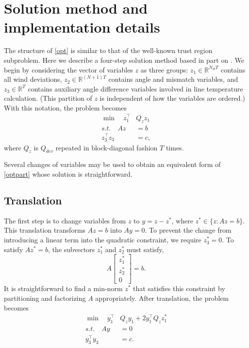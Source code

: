 \documentclass[conference]{IEEEtran}
\begin{document}
\section{Solution method and implementation details}\label{sec:solution}

The structure of \eqref{opt} is similar to that of the well-known trust region subproblem. Here we describe a four-step solution method based in part on \cite{bienstock2014}. We begin by considering the vector of variables $z$ as three groups: $z_1\in\mathbb{R}^{N_RT}$ contains all wind deviations, $z_2\in\mathbb{R}^{(N+1)T}$ contains angle and mismatch variables, and $z_3\in\mathbb{R}^T$ contains auxiliary angle difference variables involved in line temperature calculation. (This partition of $z$ is independent of how the variables are ordered.) With this notation, the problem becomes
\begin{subequations}\label{optpart}
\begin{align}
\min\quad z_1^\top &Q_z z_1 \\
s.t.\quad Az &= b \\
z_3^\top z_3 &= c,
\end{align}
\end{subequations}
where $Q_z$ is $Q_{dev}$ repeated in block-diagonal fashion $T$ times.

Several changes of variables may be used to obtain an equivalent form
of \eqref{optpart} whose solution is straightforward.

\subsection{Translation}

The first step is to change variables from $z$ to $y=z-z^*$, where
$z^*\in\{z:Az=b\}$. This translation transforms $Az=b$ into $Ay=0$. To
prevent the change from introducing a linear term into the quadratic
constraint, we require $z_3^*=0$. To satisfy $Az^*=b$, the subvectors
$z_1^*$ and $z_2^*$ must satisfy,
\[
A \begin{bmatrix} z_1^* \\ z_2^*
\\ 0 \end{bmatrix} = b.
\]
It is straightforward to find a min-norm $z^*$ that satisfies this
constraint by partitioning and factorizing $A$ appropriately. After
translation, the problem becomes
\begin{subequations}\label{opt2}
\begin{align}
\label{opt2:obj} \min\quad y_1^\top &Q_z y_1 + 2 y_1^\top Q_z z_1^* \\
\label{opt2:lin} s.t.\quad Ay &= 0 \\
\label{opt2:quad} y_3^\top y_3 &= c.
\end{align}
\end{subequations}
\end{document}
